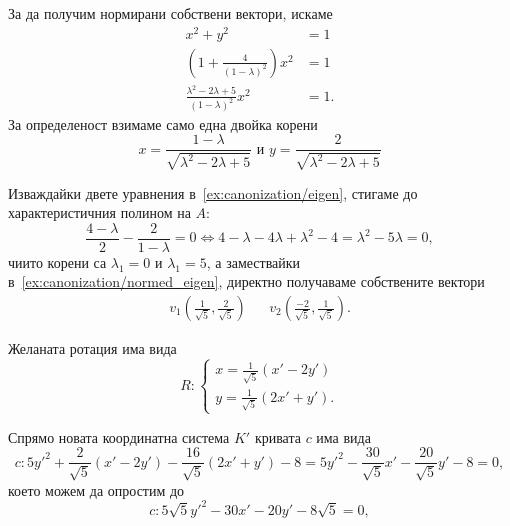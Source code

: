 \documentclass[numbers=endperiod, bibliography=totocnumbered]{scrartcl}
\begin{document}
\begin{solution}
\begin{enumerate}
    За да получим нормирани собствени вектори, искаме
    \begin{align*}
      x^2 + y^2 &= 1 \\
      \left(1 +  \frac 4 {{(1 - \lambda)}^2} \right) x^2 &= 1 \\
      \frac {\lambda^2 - 2\lambda + 5} {{(1 - \lambda)}^2} x^2 &= 1.
    \end{align*}
    За определеност взимаме само една двойка корени
    \begin{equation}
      \label{ex:canonization/normed_eigen}
      x = \frac {1 - \lambda} {\sqrt{\lambda^2 - 2\lambda + 5}}
      \text{ и }
      y = \frac 2 {\sqrt{\lambda^2 - 2\lambda + 5}}
    \end{equation}

    Изваждайки двете уравнения в~\ref{ex:canonization/eigen}, стигаме до характеристичния полином на \( A \):
    \begin{equation*}
      \frac {4 - \lambda} 2 - \frac 2 {1 - \lambda} = 0 \iff 4 - \lambda - 4\lambda + \lambda^2 - 4 = \lambda^2 - 5\lambda = 0,
    \end{equation*}
    чиито корени са \( \lambda_1 = 0 \) и \( \lambda_1 = 5 \), а замествайки в~\ref{ex:canonization/normed_eigen}, директно получаваме собствените вектори
    \begin{align*}
      v_1 \left(\frac 1 {\sqrt 5}, \frac 2 {\sqrt 5} \right)
      &&
      v_2 \left(\frac {-2} {\sqrt 5}, \frac 1 {\sqrt 5} \right).
    \end{align*}

    Желаната ротация има вида
    \begin{equation*}
      R: \begin{cases}
        x = \frac 1 {\sqrt 5} (x' - 2y') \\
        y = \frac 1 {\sqrt 5} (2x' + y').
      \end{cases}
    \end{equation*}

    Спрямо новата координатна система \( K' \) кривата \( c \) има вида
    \begin{equation*}
      c: 5y'^2 + \frac 2 {\sqrt 5} (x' - 2y') - \frac {16} {\sqrt 5} (2x' + y') - 8 = 5y'^2 - \frac {30} {\sqrt 5} x' - \frac {20} {\sqrt 5} y' - 8 = 0,
    \end{equation*}
    което можем да опростим до
    \begin{equation*}
      c: 5 \sqrt 5 y'^2 - 30 x' - 20 y' - 8 \sqrt 5 = 0,
    \end{equation*}


\end{enumerate}
\end{solution}
\end{document}
